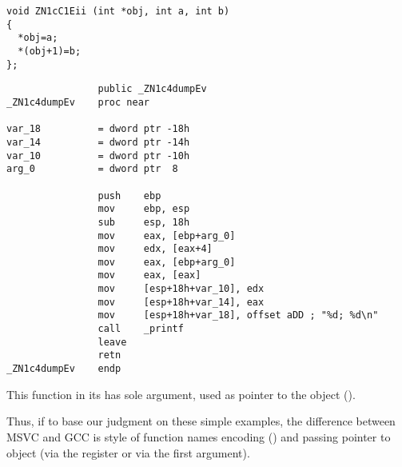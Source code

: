 
\begin{lstlisting}
void ZN1cC1Eii (int *obj, int a, int b)
{
  *obj=a;
  *(obj+1)=b;
};
\end{lstlisting}



\begin{lstlisting}
                public _ZN1c4dumpEv
_ZN1c4dumpEv    proc near

var_18          = dword ptr -18h
var_14          = dword ptr -14h
var_10          = dword ptr -10h
arg_0           = dword ptr  8

                push    ebp
                mov     ebp, esp
                sub     esp, 18h
                mov     eax, [ebp+arg_0]
                mov     edx, [eax+4]
                mov     eax, [ebp+arg_0]
                mov     eax, [eax]
                mov     [esp+18h+var_10], edx
                mov     [esp+18h+var_14], eax
                mov     [esp+18h+var_18], offset aDD ; "%d; %d\n"
                call    _printf
                leave
                retn
_ZN1c4dumpEv    endp
\end{lstlisting}

{This function in its  has sole argument, 
used as pointer to the object ().}

{Thus, if to base our judgment on these simple examples, the difference between MSVC and GCC
is style of function names encoding () and passing pointer to object
(via the \ECX register or via the first argument).}
